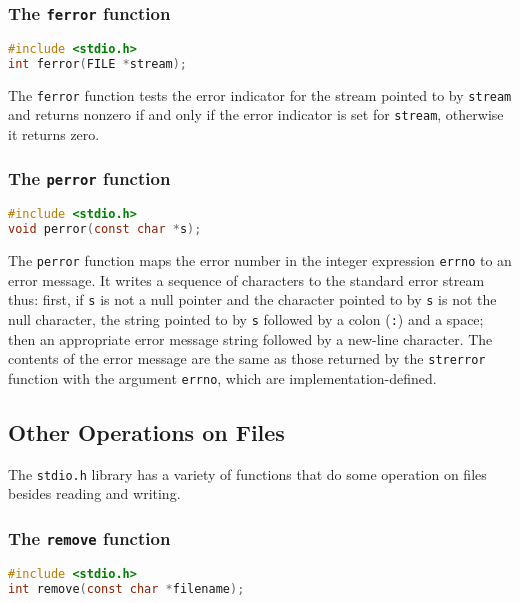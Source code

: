 \subsubsection{The \texttt{ferror} function}
\lstset{basicstyle=\scriptsize, numbers=left, captionpos=b, tabsize=4}
\begin{lstlisting}[caption=Section \thesection listing \arabic{filecnt},language={C},
breaklines=true,xleftmargin=15pt,label=lst:section\thesection listing\arabic{filecnt}]
#include <stdio.h>
int ferror(FILE *stream);
\end{lstlisting}

The \texttt{ferror} function tests the error indicator for the stream pointed
to by \texttt{stream} and returns nonzero if and only if the error indicator is
set for \texttt{stream}, otherwise it returns zero.

\subsubsection{The \texttt{perror} function}
\lstset{basicstyle=\scriptsize, numbers=left, captionpos=b, tabsize=4}
\begin{lstlisting}[caption=Section \thesection listing \arabic{filecnt},language={C},
breaklines=true,xleftmargin=15pt,label=lst:section\thesection listing\arabic{filecnt}]
#include <stdio.h>
void perror(const char *s);
\end{lstlisting}

The \texttt{perror} function maps the error number in the integer expression
\texttt{errno} to an error message. It writes a sequence of characters to the
standard error stream thus: first, if \texttt{s} is not a null pointer and the
character pointed to by \texttt{s} is not the null character, the string
pointed to by \texttt{s} followed by a colon (\texttt{:}) and a space; then an
appropriate error message string followed by a new-line character. The contents
of the error message are the same as those returned by the \texttt{strerror}
function with the argument \texttt{errno}, which are implementation-defined.

\subsection{Other Operations on Files}
The \texttt{stdio.h} library has a variety of functions that do some operation
on files besides reading and writing.

\subsubsection{The \texttt{remove} function}
\lstset{basicstyle=\scriptsize, numbers=left, captionpos=b, tabsize=4}
\begin{lstlisting}[caption=Section \thesection listing \arabic{filecnt},language={C},
breaklines=true,xleftmargin=15pt,label=lst:section\thesection listing\arabic{filecnt}]
#include <stdio.h>
int remove(const char *filename);
\end{lstlisting}

